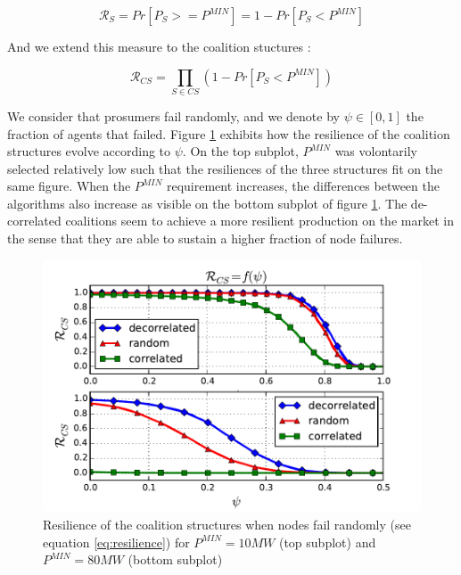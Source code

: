 \documentclass[conference]{IEEEtran}
\begin{document}
\begin{equation}
\mathcal{R}_{S} = Pr[P_{S} >= P^{MIN}] = 1 - Pr[P_{S} < P^{MIN}]
\end{equation}

And we extend this measure to the coalition stuctures :

\begin{equation}
\mathcal{R}_{CS} = \prod_{S \in CS} \left( 1 - Pr[ P_{S} < P^{MIN} ] \right)
\label{eq:resilience}
\end{equation}

We consider that prosumers fail randomly, and we denote by $ \psi \in [0,1] $ the fraction of agents that failed. Figure \ref{fig:resilience} exhibits how the resilience of the coalition structures evolve according to $ \psi $. On the top subplot, $ P^{MIN} $ was volontarily selected relatively low such that the resiliences of the three structures fit on the same figure. When the $ P^{MIN} $ requirement increases, the differences between the algorithms also increase as visible on the bottom subplot of figure \ref{fig:resilience}. The de-correlated coalitions seem to achieve a more resilient production on the market in the sense that they are able to sustain a higher fraction of node failures.

\begin{figure}
\includegraphics[scale=.6]{./figures/resilience_both.pdf}
\caption{Resilience of the coalition structures when nodes fail randomly (see equation \ref{eq:resilience}) for $ P^{MIN} = 10MW $ (top subplot) and $ P^{MIN} = 80MW $ (bottom subplot) }
\label{fig:resilience}
\end{figure}
\end{document}
